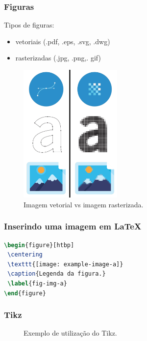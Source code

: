 \begin{frame}
\frametitle{Figuras}
Tipos de figuras:
\begin{itemize}
\item vetoriais (.pdf, .eps, .svg, .dwg)
\item rasterizadas (.jpg, .png,. gif)
\end{itemize}
\end{frame}


\begin{frame}
\begin{figure}[h]
 \centering
 \includegraphics[width=0.45\textwidth,height=0.8\textheight,keepaspectratio]{figures/vector-raster.png}
 \caption{Imagem vetorial vs imagem rasterizada.}
 \label{fig-imgvr}
\end{figure}
\end{frame}

\begin{frame}[fragile]
\frametitle{Inserindo uma imagem em \LaTeX{}}
\begin{lstlisting}[language=tex, label=lst-figure, caption={Código para inserir uma figura em \LaTeX{}}, postbreak=\mbox{$\hookrightarrow$\space}, basicstyle=\fontsize{8}{10}\selectfont\ttfamily]
\begin{figure}[htbp]
 \centering
 \texttt{[image: example-image-a]}
 \caption{Legenda da figura.}
 \label{fig-img-a}
\end{figure}
\end{lstlisting}
\end{frame}



\begin{frame}
\frametitle{Tikz}
\begin{figure}[h]
\centering
{}
\caption{Exemplo de utilização do Tikz.}
 \label{fig-tikz}
\end{figure}
\end{frame}


